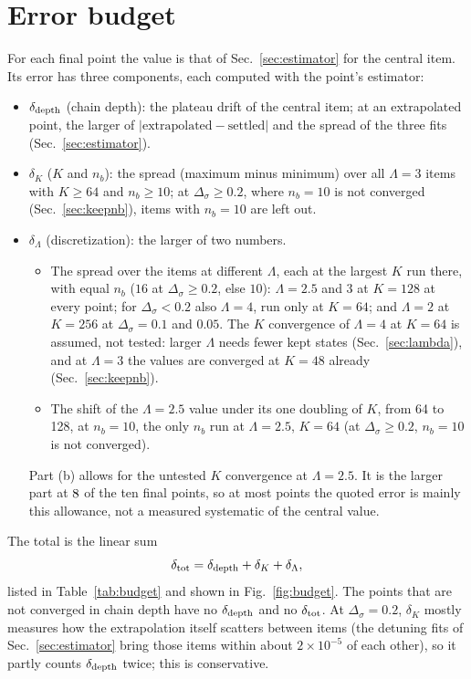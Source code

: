 \documentclass[10pt,a4paper]{article}
\newcommand{\Ds}{\Delta_\sigma}
\newcommand{\dd}{\delta_{\rm depth}}
\newcommand{\dK}{\delta_K}
\newcommand{\dL}{\delta_\Lambda}
\newcommand{\dtot}{\delta_{\rm tot}}
\begin{document}
\section{Error budget}\label{sec:budget}
For each final point the value is that of Sec.~\ref{sec:estimator} for the central item. Its error has three components, each computed
with the point's estimator:
\begin{itemize}
\item $\dd$ (chain depth): the plateau drift of the central item; at an extrapolated point, the larger of $|\text{extrapolated}-
  \text{settled}|$ and the spread of the three fits (Sec.~\ref{sec:estimator}).
\item $\dK$ ($K$ and $n_b$): the spread (maximum minus minimum) over all $\Lambda=3$ items with $K\ge64$ and $n_b\ge10$; at $\Ds\ge0.2$,
  where $n_b=10$ is not converged (Sec.~\ref{sec:keepnb}), items with $n_b=10$ are left out.
\item $\dL$ (discretization): the larger of two numbers.
  \begin{itemize}
  \item[(a)] The spread over the items at different $\Lambda$, each at the largest $K$ run there, with equal $n_b$ ($16$ at $\Ds\ge0.2$,
    else $10$): $\Lambda=2.5$ and $3$ at $K=128$ at every point; for $\Ds<0.2$ also $\Lambda=4$, run only at $K=64$; and $\Lambda=2$ at
    $K=256$ at $\Ds=0.1$ and $0.05$. The $K$ convergence of $\Lambda=4$ at $K=64$ is assumed, not tested: larger $\Lambda$ needs
    fewer kept states (Sec.~\ref{sec:lambda}), and at $\Lambda=3$ the values are converged at $K=48$ already (Sec.~\ref{sec:keepnb}).
  \item[(b)] The shift of the $\Lambda=2.5$ value under its one doubling of $K$, from 64 to 128, at $n_b=10$, the only $n_b$ run at
    $\Lambda=2.5$, $K=64$ (at $\Ds\ge0.2$, $n_b=10$ is not converged).
  \end{itemize}
  Part (b) allows for the untested $K$ convergence at $\Lambda=2.5$. It is the larger part at $8$ of the ten final points,
  so at most points the quoted error is mainly this allowance, not a measured systematic of the central value.
\end{itemize}
The total is the linear sum
\begin{equation}
\dtot=\dd+\dK+\dL,\label{eq:budget}
\end{equation}
listed in Table~\ref{tab:budget} and shown in Fig.~\ref{fig:budget}. The points that are not converged in chain depth have no $\dd$
and no $\dtot$. At $\Ds=0.2$, $\dK$ mostly measures how the extrapolation itself scatters between items (the detuning fits of
Sec.~\ref{sec:estimator} bring those items within about $2\times10^{-5}$ of each other), so it partly counts $\dd$ twice; this is
conservative.
\end{document}
